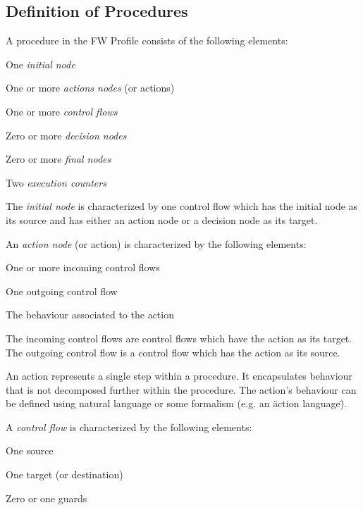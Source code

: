 \subsection{Definition of Procedures}
A procedure in the FW Profile consists of the following elements:

\begin{fw_itemize}
\item One \emph{initial node}
\item One or more \emph{actions nodes} (or actions)
\item One or more \emph{control flows}
\item Zero or more \emph{decision nodes}
\item Zero or more \emph{final nodes}
\item Two \emph{execution counters}
\end{fw_itemize}

The \emph{initial node} is characterized by one control flow which has the initial node as its source
and has either an action node or a decision node as its target.

An \emph{action node} (or action) is characterized by the following elements:

\begin{fw_itemize}
\item One or more incoming control flows
\item One outgoing control flow
\item The behaviour associated to the action
\end{fw_itemize}

The incoming control flows are control flows which have the action as its target. The outgoing
control flow is a control flow which has the action as its source.

An action represents a single step within a procedure. It encapsulates behaviour that is not
decomposed further within the procedure. The action's behaviour can be defined using natural
language or some formalism (e.g. an \"action language\").

A \emph{control flow} is characterized by the following elements:

\begin{fw_itemize}
\item One source
\item One target (or destination)
\item Zero or one guards
\end{fw_itemize}

